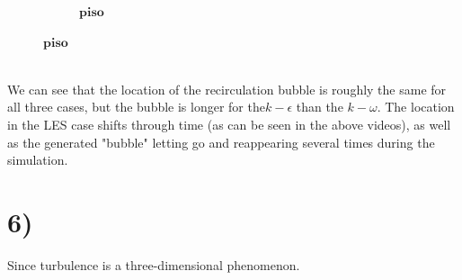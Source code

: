 \documentclass[a4paper,english,11pt,twoside]{article}
\begin{document}
\begin{figure}[h!]
\begin{subfigure}{0.3\linewidth}
		\caption{$\mathbf{piso}$}
	\end{subfigure}
\end{figure}\\
We can see that the location of the recirculation bubble is roughly the same for all three cases, but the bubble is longer for the$k-\epsilon$ than the $k-\omega$. The location in the LES case shifts through time (as can be seen in the above videos), as well as the generated "bubble" letting go and reappearing several times during the simulation. 
\section*{6)}
Since turbulence is a three-dimensional phenomenon.
 
\end{document}
